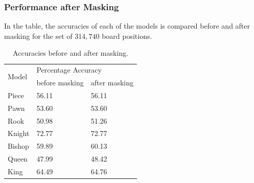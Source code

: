\documentclass[9pt, unknownkeysallowed]{beamer}
\begin{document}
\begin{frame}
 \frametitle{Performance after Masking}
 In the table, the accuracies of each of the models is compared before 
and after masking for the set of $314,740$ board positions.
 \begin{table}
\centering
\begin{tabular}{@{}lll@{}}
\toprule
\multirow{2}{*}{Model} & \multicolumn{2}{l}{Percentage Accuracy} \\ 
\cmidrule(l){2-3} 
                       & before masking      & after masking     \\ \midrule
Piece                  & 56.11               & 56.11             \\
Pawn                   & 53.60               & 53.60             \\
Rook                   & 50.98               & 51.26             \\
Knight                 & 72.77               & 72.77             \\
Bishop                 & 59.89               & 60.13             \\
Queen                  & 47.99               & 48.42             \\
King                   & 64.49               & 64.76             \\ 
\bottomrule
\end{tabular}
\caption{Accuracies before and after masking.}
\end{table}
\end{frame}
\end{document}
